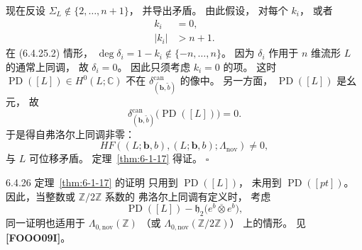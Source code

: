 现在反设
$\Sigma_L\notin\{2,\ldots,n+1\}$，
并导出矛盾。
由此假设，
对每个 $k_i$，
或者
\begin{align}
k_i&=0,
\tag{6.4.25.1}\label{eq:6-4-25-1}\\
|k_i|&>n+1.
\tag{6.4.25.2}\label{eq:6-4-25-2}
\end{align}
在 (6.4.25.2) 情形，
$\deg\delta_i=1-k_i
\notin\{-n,\ldots,n\}$。
因为 $\delta_i$ 作用于
$n$ 维流形 $L$ 的通常上同调，
故 $\delta_i=0$。
因此只须考虑 $k_i=0$ 的项。
这时
$\operatorname{PD}([L])\in H^0(L;\mathbb C)$
不在
$\delta^{\mathrm{can}}_{(\boldsymbol b,\widetilde b)}$
的像中。
另一方面，
$\operatorname{PD}([L])$ 是幺元，
故
\[
\delta^{\mathrm{can}}_{(\boldsymbol b,\widetilde b)}
\bigl(\operatorname{PD}([L])\bigr)=0.
\]
于是得自弗洛尔上同调非零：
\[
HF((L;\boldsymbol b,b),(L;\boldsymbol b,b);
\Lambda_{\mathrm{nov}})\ne0,
\]
与 $L$ 可位移矛盾。
定理~\ref{thm:6-1-17} 得证。
\hfill$\square$

\begin{remark}{6.4.26}\label{rem:6-4-26}
定理~\ref{thm:6-1-17} 的证明
只用到 $\operatorname{PD}([L])$，
未用到 $\operatorname{PD}([pt])$。
因此，当整数或 $\mathbb Z/2\mathbb Z$ 系数的
弗洛尔上同调有定义时，
考虑
\[
\operatorname{PD}([L])
-\mathfrak h_2
\bigl(e^b\mathbin{\overline\otimes}e^b\bigr),
\]
同一证明也适用于
$\Lambda_{0,\mathrm{nov}}(\mathbb Z)$
（或
$\Lambda_{0,\mathrm{nov}}(\mathbb Z/2\mathbb Z)$）
上的情形。
见 \textbf{[FOOO09I]}。
\end{remark}
